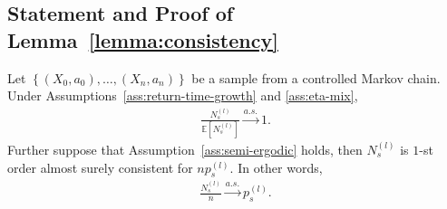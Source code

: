 \documentclass[twoside,11pt]{article}
\newcommand{\pow}[1]{^{(#1)}}%
\numberwithin{equation}{section}
\newcommand{\indexeddata}{\left\{(X_0,a_0),\dots,(X_n,a_n)\right\}}
\newcommand{\expec}{\mathbb{E}}
\begin{document}
\subsection{Statement and Proof of Lemma~\ref{lemma:consistency}}
\label{sec:lemma_consistency}
\begin{lemma}\label{lemma:consistency}
    Let $\indexeddata$ be a sample from a controlled Markov chain. Under Assumptions~\ref{ass:return-time-growth} and \ref{ass:eta-mix},
    \begin{align*}
       \frac{N_s\pow l}{\expec[N_s\pow l]}\xrightarrow{a.s.} 1. 
    \end{align*}
    Further suppose that Assumption~\ref{ass:semi-ergodic} holds, then $N_s \pow l$ is $1$-st order almost surely consistent for $n p_s \pow l$. 
    In other words,
    \begin{align*}
    \frac{N_s\pow l}{n}\xrightarrow{a.s.}  p_s \pow l.
    \end{align*}
\end{lemma}
\end{document}
